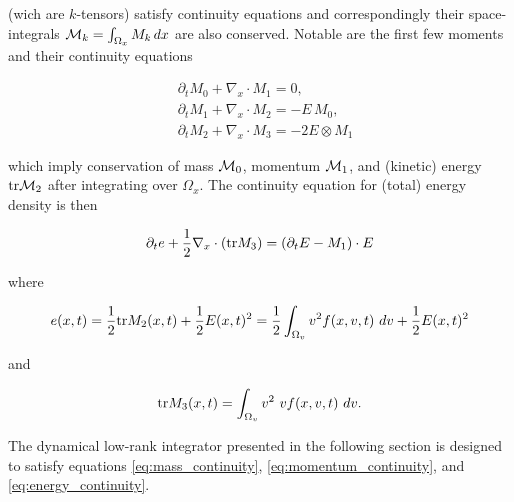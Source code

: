 (wich are $k$-tensors) satisfy continuity equations and correspondingly their 
space-integrals $\mathcal{M}_k = \int_{\Omega_x} M_k\, dx$ are also conserved. Notable are 
the first few moments and their continuity equations

\begin{align}
    &\partial_t M_0 + \nabla_x \cdot M_1 = 0, \label{eq:mass_continuity}\\
    &\partial_t M_1 + \nabla_x \cdot M_2 = - E\, M_0, \label{eq:momentum_continuity}\\
    &\partial_t M_2 + \nabla_x \cdot M_3 = - 2 E \otimes M_1
\end{align}

which imply conservation of mass $\mathcal{M}_0$, momentum $\mathcal{M}_1$, and (kinetic) energy 
$\text{tr} \mathcal{M}_2$ 
after integrating over $\Omega_x$. The continuity equation for (total) energy density is 
then 

\begin{equation}\label{eq:energy_continuity}
    \partial_t e + \frac{1}{2} \nabla_x \cdot (\text{tr} M_3) = (\partial_t E - M_1) \cdot E
\end{equation}

where 

\begin{equation}
    e(x, t) = \frac{1}{2} \text{tr} M_2 (x, t) + \frac{1}{2} E(x, t)^2
    = \frac{1}{2} \int_{\Omega_v} v^2 f(x, v, t)\ dv + \frac{1}{2} E(x, t)^2  
\end{equation}

and 

\begin{equation}
    \trace M_3 (x, t) = \int_{\Omega_v} v^2\ v f(x, v, t)\ dv . 
\end{equation}

The dynamical low-rank integrator presented in the following section is designed to 
satisfy equations \ref{eq:mass_continuity}, \ref{eq:momentum_continuity}, and 
\ref{eq:energy_continuity}. 



